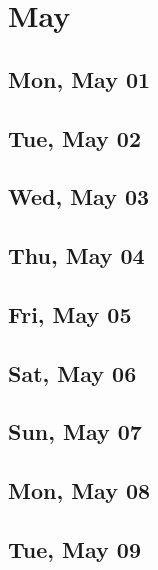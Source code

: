 \chapter{May}
	\section{Mon, May 01}
		
		
	\section{Tue, May 02}
		
		
	\section{Wed, May 03}
		
		
	\section{Thu, May 04}
		
		
	\section{Fri, May 05}
		
		
	\section{Sat, May 06}
		
		
	\section{Sun, May 07}
		
		
	\section{Mon, May 08}
		
		
	\section{Tue, May 09}
		
		
